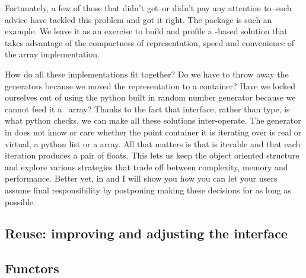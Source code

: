 Fortunately, a few of those that didn't get--or didn't pay any attention to--such advice have
tackled this problem and got it right. The package  \cite{numpy} is such an
example. We leave it as an exercise to build and profile a -based solution
that takes advantage of the compactness of representation, speed and convenience of the array
implementation.

How do all these implementations fit together? Do we have to throw away the generators because
we moved the representation to a  container? Have we locked ourselves out of
using the python built in random number generator because we cannot feed it a \cc\ array?
Thanks to the fact that interface, rather than type, is what python checks, we can make all
these solutions inter-operate. The generator  in
 does not know or care whether the point container it is
iterating over is real or virtual, a python list or a  array. All that
matters is that  is iterable and that each iteration produces a pair of
floats. This lets us keep the object oriented structure and explore various strategies that
trade off between complexity, memory and performance. Better yet, in  and
 I will show you how you can let your users assume final responsibility by
postponing making these decisions for as long as possible.

\subsection{Reuse: improving and adjusting the interface}
\label{sec:classes:interface}

%
%
%
%
%


\subsection{Functors}
\label{sec:classes:functors}



